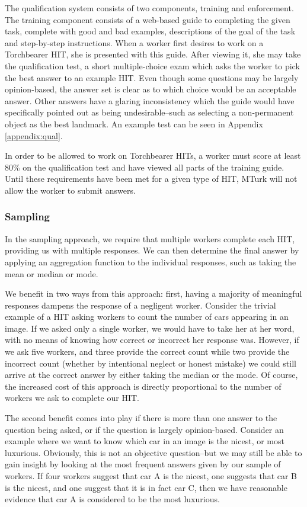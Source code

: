 The qualification system consists of two components, training and enforcement. The training component consists of a web-based guide to completing the given task, complete with good and bad examples, descriptions of the goal of the task and step-by-step instructions. When a worker first desires to work on a Torchbearer HIT, she is presented with this guide. After viewing it, she may take the qualification test, a short multiple-choice exam which asks the worker to pick the best answer to an example HIT. Even though some questions may be largely opinion-based, the answer set is clear as to which choice would be an acceptable answer. Other answers have a glaring inconsistency which the guide would have specifically pointed out as being undesirable--such as selecting a non-permanent object as the best landmark. An example test can be seen in Appendix \ref{appendix:qual}.

In order to be allowed to work on Torchbearer HITs, a worker must score at least 80\% on the qualification test and have viewed all parts of the training guide. Until these requirements have been met for a given type of HIT, MTurk will not allow the worker to submit answers. 

\subsubsection{Sampling}

In the sampling approach, we require that multiple workers complete each HIT, providing us with multiple responses. We can then determine the final answer by applying an aggregation function to the individual responses, such as taking the mean or median or mode. 

We benefit in two ways from this approach: first, having a majority of meaningful responses dampens the response of a negligent worker. Consider the trivial example of a HIT asking workers to count the number of cars appearing in an image. If we asked only a single worker, we would have to take her at her word, with no means of knowing how correct or incorrect her response was. However, if we ask five workers, and three provide the correct count while two provide the incorrect count (whether by intentional neglect or honest mistake) we could still arrive at the correct answer by either taking the median or the mode. Of course, the increased cost of this approach is directly proportional to the number of workers we ask to complete our HIT.

The second benefit comes into play if there is more than one answer to the question being asked, or if the question is largely opinion-based. Consider an example where we want to know which car in an image is the nicest, or most luxurious. Obviously, this is not an objective question--but we may still be able to gain insight by looking at the most frequent answers given by our sample of workers. If four workers suggest that car A is the nicest, one suggests that car B is the nicest, and one suggest that it is in fact car C, then we have reasonable evidence that car A is considered to be the most luxurious.


